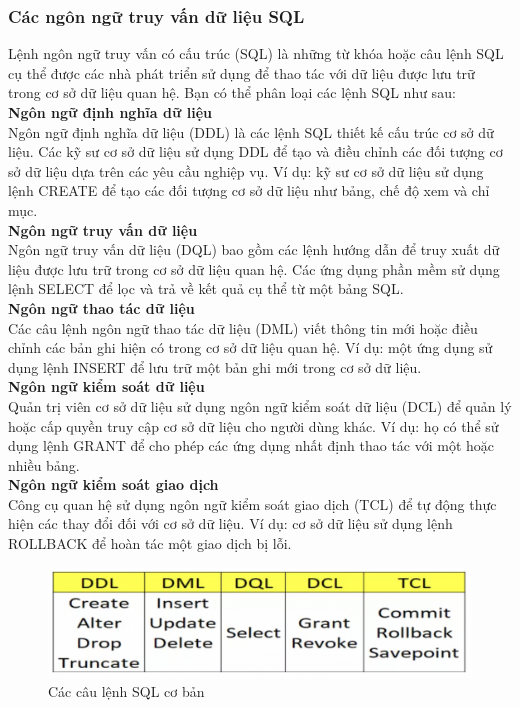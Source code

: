 \subsubsection{Các ngôn ngữ truy vấn dữ liệu SQL}
\hspace*{1cm}Lệnh ngôn ngữ truy vấn có cấu trúc (SQL) là những từ khóa hoặc câu lệnh SQL cụ thể được các nhà phát triển sử dụng để thao tác với dữ liệu được lưu trữ trong cơ sở dữ liệu quan hệ. Bạn có thể phân loại các lệnh SQL như sau:\\
\hspace*{1cm}\textbf{Ngôn ngữ định nghĩa dữ liệu}\\
\hspace*{1cm}Ngôn ngữ định nghĩa dữ liệu (DDL) là các lệnh SQL thiết kế cấu trúc cơ sở dữ liệu. Các kỹ sư cơ sở dữ liệu sử dụng DDL để tạo và điều chỉnh các đối tượng cơ sở dữ liệu dựa trên các yêu cầu nghiệp vụ. Ví dụ: kỹ sư cơ sở dữ liệu sử dụng lệnh CREATE để tạo các đối tượng cơ sở dữ liệu như bảng, chế độ xem và chỉ mục.\\
\hspace*{1cm}\textbf{Ngôn ngữ truy vấn dữ liệu}\\
\hspace*{1cm}Ngôn ngữ truy vấn dữ liệu (DQL) bao gồm các lệnh hướng dẫn để truy xuất dữ liệu được lưu trữ trong cơ sở dữ liệu quan hệ. Các ứng dụng phần mềm sử dụng lệnh SELECT để lọc và trả về kết quả cụ thể từ một bảng SQL.\\
\hspace*{1cm}\textbf{Ngôn ngữ thao tác dữ liệu}\\
\hspace*{1cm}Các câu lệnh ngôn ngữ thao tác dữ liệu (DML) viết thông tin mới hoặc điều chỉnh các bản ghi hiện có trong cơ sở dữ liệu quan hệ. Ví dụ: một ứng dụng sử dụng lệnh INSERT để lưu trữ một bản ghi mới trong cơ sở dữ liệu.\\
\hspace*{1cm}\textbf{Ngôn ngữ kiểm soát dữ liệu}\\
\hspace*{1cm}Quản trị viên cơ sở dữ liệu sử dụng ngôn ngữ kiểm soát dữ liệu (DCL) để quản lý hoặc cấp quyền truy cập cơ sở dữ liệu cho người dùng khác. Ví dụ: họ có thể sử dụng lệnh GRANT để cho phép các ứng dụng nhất định thao tác với một hoặc nhiều bảng.\\
\hspace*{1cm}\textbf{Ngôn ngữ kiểm soát giao dịch}\\
\hspace*{1cm}Công cụ quan hệ sử dụng ngôn ngữ kiểm soát giao dịch (TCL) để tự động thực hiện các thay đổi đối với cơ sở dữ liệu. Ví dụ: cơ sở dữ liệu sử dụng lệnh ROLLBACK để hoàn tác một giao dịch bị lỗi.
\begin{figure}[H]
	\centering
	\includegraphics[width=\textwidth]{Images/lệnh SQL.png}
	\vspace{0.5cm}
	\caption{Các câu lệnh SQL cơ bản}
\end{figure}
